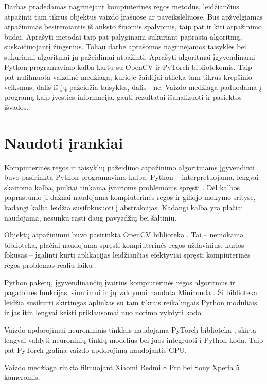 \documentclass{VUMIFPSbakalaurinis}
\begin{document}
Darbas pradedamas nagrinėjant kompiuterinės regos metodus, leidžiančius atpažinti tam tikrus objektus vaizdo įrašuose ar paveikslėliuose. Bus apžvelgiamas atpažinimas besiremiantis iš anksto žinomis spalvomis, taip pat ir kiti atpažinimo būdai. Aprašyti metodai taip pat palyginami sukuriant paprastą algoritmą, suskaičiuojantį žingsnius. Toliau darbe aprašomos nagrinėjamos taisyklės bei sukuriami algoritmai jų pažeidimui atpažinti. Aprašyti algoritmai įgyvendinami Python programavimo kalba kartu su OpenCV ir PyTorch bibliotekomis. Taip pat nufilmuota vaizdinė medžiaga, kurioje žaidėjai atlieka tam tikrus krepšinio veiksmus, dalis iš jų pažeidžia taisykles, dalis - ne. Vaizdo medžiaga paduodama į programą kaip įvesties informacija, gauti rezultatai išanalizuoti ir pasiektos išvados.


\section{Naudoti įrankiai}

Kompiuterinės regos ir taisyklių pažeidimo atpažinimo algoritmams įgyvendinti buvo pasirinkta Python programavimo kalba. Python – interpretuojama, lengvai skaitoma kalba, puikiai tinkama įvairioms problemoms spręsti \cite{Python}. Dėl kalbos paprastumo ji dažnai naudojama kompiuterinės regos ir giliojo mokymo srityse, kadangi kalba leidžia susifokusuoti į abstrakcijas. Kadangi kalba yra plačiai naudojama, nesunku rasti daug pavyzdžių bei šaltinių. 

Objektų atpažinimui buvo pasirinkta OpenCV biblioteka \cite{opencv}. Tai – nemokama biblioteka, plačiai naudojama spręsti kompiuterinės regos uždavinius, kurios fokusas – įgalinti kurti aplikacijas leidžiančias efektyviai spręsti kompiuterinės regos problemas realiu laiku \cite{BradskiOpenCV}.

Python paketų, įgyvendinančių įvairius kompiuterinės regos algoritmus ir pagalbines funkcijas, siuntimui ir jų valdymui naudota Miniconda \cite{conda}. Ši biblioteka leidžia susikurti skirtingas aplinkas su tam tikrais reikalingais Python moduliais ir jas itin lengvai keisti priklausomai nuo norimo vykdyti kodo.

Vaizdo apdorojimui neuroniniais tinklais naudojama PyTorch biblioteka \cite{pytorch}, skirta lengvai valdyti neuroninių tinklų modelius bei juos integruoti į Python kodą. Taip pat PyTorch įgalina vaizdo apdorojimą naudojantis GPU. 

Vaizdo medžiaga rinkta filmuojant Xiaomi Redmi 8 Pro bei Sony Xperia 5 kameromis.  
\end{document}
